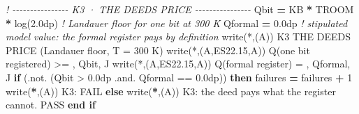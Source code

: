 \documentclass[10pt]{article}
\renewcommand{\_}{\origunderscore\allowbreak}
\newenvironment{Shaded}{}{}
\newcommand{\BuiltInTok}[1]{#1}
\newcommand{\CommentTok}[1]{\textit{#1}}
\newcommand{\DecValTok}[1]{#1}
\newcommand{\FloatTok}[1]{#1}
\newcommand{\FunctionTok}[1]{#1}
\newcommand{\KeywordTok}[1]{\textbf{#1}}
\newcommand{\NormalTok}[1]{#1}
\newcommand{\OperatorTok}[1]{#1}
\newcommand{\StringTok}[1]{#1}
\begin{document}
\begin{Shaded}
\begin{Highlighting}[]
  \CommentTok{! {-}{-}{-}{-}{-}{-}{-}{-}{-}{-}{-}{-}{-}{-}{-}{-} K3 · THE DEED\textquotesingle{}S PRICE {-}{-}{-}{-}{-}{-}{-}{-}{-}{-}{-}{-}{-}{-}{-}{-}}
\NormalTok{  Q\_bit    }\KeywordTok{=}\NormalTok{ KB }\KeywordTok{*}\NormalTok{ T\_ROOM }\KeywordTok{*} \BuiltInTok{log}\NormalTok{(}\FloatTok{2.0\_dp}\NormalTok{)   }\CommentTok{! Landauer floor for one bit at 300 K}
\NormalTok{  Q\_formal }\KeywordTok{=} \FloatTok{0.0\_dp}                      \CommentTok{! stipulated model value: the formal register pays by definition}
  \FunctionTok{write(*}\NormalTok{,}\StringTok{\textquotesingle{}(A)\textquotesingle{}}\FunctionTok{)} \StringTok{\textquotesingle{}K3 THE DEED\textquotesingle{}\textquotesingle{}S PRICE (Landauer floor, T = 300 K)\textquotesingle{}}
  \FunctionTok{write(*}\NormalTok{,}\StringTok{\textquotesingle{}(A,ES22.15,A)\textquotesingle{}}\FunctionTok{)} \StringTok{\textquotesingle{}  Q(one bit registered) \textgreater{}= \textquotesingle{}}\NormalTok{, Q\_bit, }\StringTok{\textquotesingle{} J\textquotesingle{}}
  \FunctionTok{write(*}\NormalTok{,}\StringTok{\textquotesingle{}(A,ES22.15,A)\textquotesingle{}}\FunctionTok{)} \StringTok{\textquotesingle{}  Q(formal register)    =  \textquotesingle{}}\NormalTok{, Q\_formal, }\StringTok{\textquotesingle{} J\textquotesingle{}}
  \KeywordTok{if}\NormalTok{ (}\OperatorTok{.not.}\NormalTok{ (Q\_bit }\OperatorTok{\textgreater{}} \FloatTok{0.0\_dp} \OperatorTok{.and.}\NormalTok{ Q\_formal }\OperatorTok{==} \FloatTok{0.0\_dp}\NormalTok{)) }\KeywordTok{then}
\BuiltInTok{     f}\NormalTok{ailures }\KeywordTok{=}\NormalTok{ failures }\KeywordTok{+} \DecValTok{1}
\BuiltInTok{     w}\NormalTok{rite(}\KeywordTok{*}\NormalTok{,}\StringTok{\textquotesingle{}(A)\textquotesingle{}}\NormalTok{) }\StringTok{\textquotesingle{}  K3: FAIL\textquotesingle{}}
  \KeywordTok{else}
\BuiltInTok{     w}\NormalTok{rite(}\KeywordTok{*}\NormalTok{,}\StringTok{\textquotesingle{}(A)\textquotesingle{}}\NormalTok{) }\StringTok{\textquotesingle{}  K3: the deed pays what the register cannot. PASS\textquotesingle{}}
  \KeywordTok{end if}


\end{Highlighting}
\end{Shaded}
\end{document}

